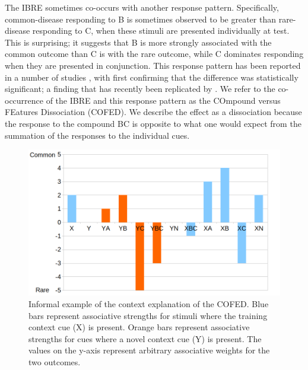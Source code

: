 \documentclass[twocolumn]{article}
\begin{document}
The IBRE sometimes co-occurs with another response pattern. Specifically, common-disease responding to B is sometimes observed to be greater than rare-disease responding to C, when these stimuli are presented individually at test. This is surprising; it suggests that B is more strongly associated with the common outcome than C is with the rare outcome, while C dominates responding when they are presented in conjunction. This response pattern has been reported in a number of studies \citep[e.g.][]{Bohil2005, Winman2005}, with \cite{Wills2014} first confirming that the difference was statistically significant; a finding that has recently been replicated by \cite[Exp.~3]{Inkster2019}. We refer to the co-occurrence of the IBRE and this response pattern as the COmpound versus FEatures Dissociation (COFED). We describe the effect as a dissociation because the response to the compound BC is opposite to what one would expect from the summation of the responses to the individual cues. 


\begin{figure}[t]
	\centering
	\includegraphics[width = .49\textwidth,trim = 0cm 0cm 0cm  0cm,clip]{cstims.png}
	\caption{Informal example of the context explanation of the COFED. Blue bars represent associative strengths for stimuli where the training context cue (X) is present. Orange bars represent associative strengths for cues where a novel context cue (Y) is present. The values on the y-axis represent arbitrary associative weights for the two outcomes.}
	\label{cstims}
\end{figure}
\end{document}
